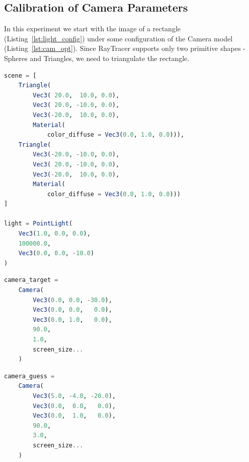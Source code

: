 \documentclass{juliacon}
\begin{document}
\subsection{Calibration of Camera Parameters}
\label{sec:calcam}

In this experiment we start with the image of a rectangle (Listing~\ref{lst:light_config}) under some configuration of the Camera model (Listing~\ref{lst:cam_opt}). Since RayTracer supports only two primitive shapes - Spheres and Triangles, we need to triangulate the rectangle.

\begin{lstlisting}[caption = {Configuration of the Scene for Experiment~\ref{sec:calcam}},
                   label = {lst:light_config},
                   captionpos = b,
                   language = Julia]
scene = [
    Triangle(
        Vec3( 20.0,  10.0, 0.0),
        Vec3( 20.0, -10.0, 0.0),
        Vec3(-20.0,  10.0, 0.0),
        Material(
            color_diffuse = Vec3(0.0, 1.0, 0.0))),
    Triangle(
        Vec3(-20.0, -10.0, 0.0),
        Vec3( 20.0, -10.0, 0.0),
        Vec3(-20.0,  10.0, 0.0),
        Material(
            color_diffuse = Vec3(0.0, 1.0, 0.0)))
]

light = PointLight(
    Vec3(1.0, 0.0, 0.0),
    100000.0,
    Vec3(0.0, 0.0, -10.0)
)
\end{lstlisting}

\noindent
\begin{minipage}{\linewidth}
\begin{lstlisting}[caption = {Camera Parameters to be Reconstructed},
                   label = {lst:cam_opt},
                   captionpos = b,
                   language = Julia]
camera_target =
    Camera(
        Vec3(0.0, 0.0, -30.0),
        Vec3(0.0, 0.0,   0.0),
        Vec3(0.0, 1.0,   0.0),
        90.0,
        1.0,
        screen_size...
    )
\end{lstlisting}
\end{minipage}

\noindent
\begin{minipage}{\linewidth}
\begin{lstlisting}[caption = {Initial Guess of the Camera Parameters},
                   label = {lst:cam_initial},
                   captionpos = b,
                   language = Julia]
camera_guess =
    Camera(
        Vec3(5.0, -4.0, -20.0),
        Vec3(0.0,  0.0,   0.0),
        Vec3(0.0,  1.0,   0.0),
        90.0,
        3.0,
        screen_size...
    )
\end{lstlisting}
\end{minipage}
\end{document}
